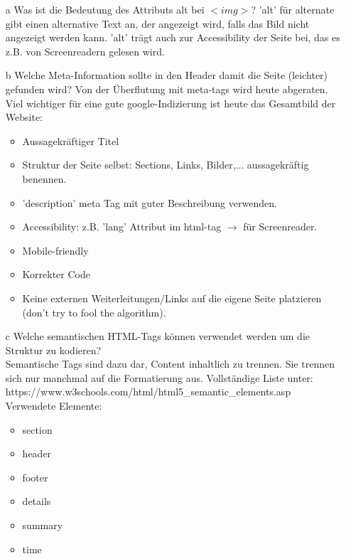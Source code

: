\documentclass[12pt, a4paper]{report}
\begin{document}
\begin{itemize}
  \item[a] Was ist die Bedeutung des Attributs alt bei $<img>$?
  'alt' für alternate gibt einen alternative Text an, der angezeigt wird, falls das Bild nicht
  angezeigt werden kann. 'alt' trägt auch zur Accessibility der Seite bei, das es z.B. von Screenreadern
  gelesen wird.
  \item[b] Welche Meta-Information sollte in den Header damit die Seite (leichter) gefunden wird?
  Von der Überflutung mit meta-tags wird heute abgeraten. Viel wichtiger für eine gute google-Indizierung ist
  heute das Gesamtbild der Website:
  \begin{itemize}
  	\item Aussagekräftiger Titel
  	\item Struktur der Seite selbst: Sections, Links, Bilder,... aussagekräftig benennen.
  	\item 'description' meta Tag mit guter Beschreibung verwenden.
  	\item Accessibility: z.B. 'lang' Attribut im html-tag $\rightarrow$ für Screenreader.
  	\item Mobile-friendly
  	\item Korrekter Code
  	\item Keine externen Weiterleitungen/Links auf die eigene Seite platzieren (don't try to fool the algorithm).
  \end{itemize}
  \item[c] Welche semantischen HTML-Tags können verwendet werden um die Struktur zu kodieren?\\
  Semantische Tags sind dazu dar, Content inhaltlich zu trennen. Sie trennen sich nur manchmal auf die 
  Formatierung aus.
  Vollständige Liste unter:\\
  https://www.w3schools.com/html/html5\_semantic\_elements.asp\\
  Verwendete Elemente:\\
  \begin{itemize}
  	\item section
  	\item header
  	\item footer
  	\item details
  	\item summary
  	\item time
  \end{itemize}  
\end{itemize}
\end{document}
